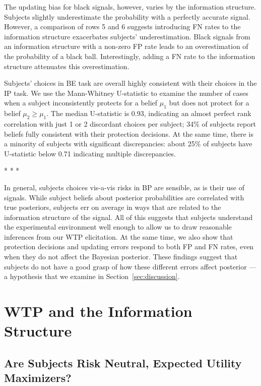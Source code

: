 \documentclass[12pt,a4paper]{article}
\begin{document}
The updating bias for black signals, however, varies by the information structure. Subjects slightly underestimate the probability with a perfectly accurate signal. However, a comparison of rows 5 and 6 suggests introducing FN rates to the information structure exacerbates subjects' underestimation. Black signals from an information structure with a non-zero FP rate leads to an overestimation of the probability of a black ball. Interestingly, adding a FN rate to the information structure attenuates this overestimation.


Subjects' choices in BE task are overall highly consistent with their choices in the IP task. We use the Mann-Whitney U-statistic to examine the number of cases when a subject inconsistently protects for a belief $\mu_1$ but does not protect for a belief $\mu_2\geq \mu_1$. The median U-statistic is 0.93, indicating an almost perfect rank correlation with just 1 or 2 discordant choices per subject; 34\% of subjects report beliefs fully consistent with their protection decisions. At the same time, there is a minority of subjects with significant discrepancies: about 25\% of subjects have U-statistic below 0.71 indicating multiple discrepancies.
\bigskip


\begin{center} * * * \end{center}
In general, subjects choices vis-a-vis risks in BP are sensible, as is their use of signals. While subject beliefs about posterior probabilities are correlated with true posteriors, subjects err on average in ways that are related to the information structure of the signal.  All of this suggests that subjects understand the experimental environment well enough to allow us to draw reasonable inferences from our WTP elicitation. At the same time, we also show that protection decisions and updating errors respond to both FP and FN rates, even when they do not affect the Bayesian posterior. These findings suggest that subjects do not have a good grasp of how these different errors affect posterior --- a hypothesis that we examine in Section~\ref{sec:discussion}.

\section{WTP and the Information Structure}\label{sec:results}

\subsection{Are Subjects Risk Neutral, Expected Utility Maximizers?} 
\end{document}
